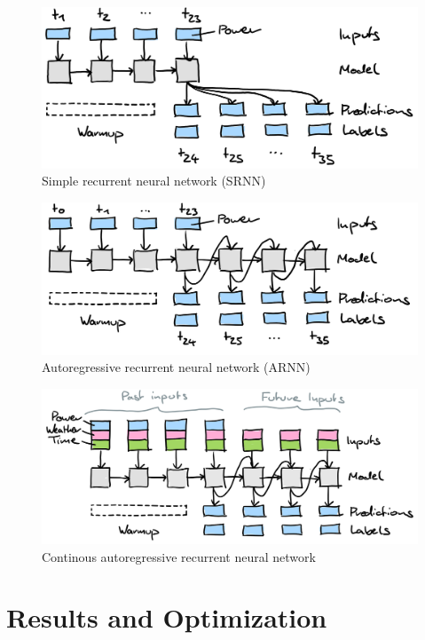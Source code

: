 \documentclass[11pt,table]{article}
\begin{document}
\begin{figure}[H]
	\centering
	\includegraphics[scale=1]{Figures/SRNN.png}
	\caption{Simple recurrent neural network (SRNN)}
	\label{fig:SRNN}
\end{figure}

\begin{figure}[H]
	\centering
	\includegraphics[scale=1]{Figures/ARNN.png}
	\caption{Autoregressive recurrent neural network (ARNN)}
	\label{fig:ARNN}
\end{figure}

\begin{figure}[H]
	\centering
	\includegraphics[scale=1]{Figures/continousARNN.png}
	\caption{Continous autoregressive recurrent neural network}
	\label{fig:continousARNN}
\end{figure}

\section{Results and Optimization}
\end{document}
